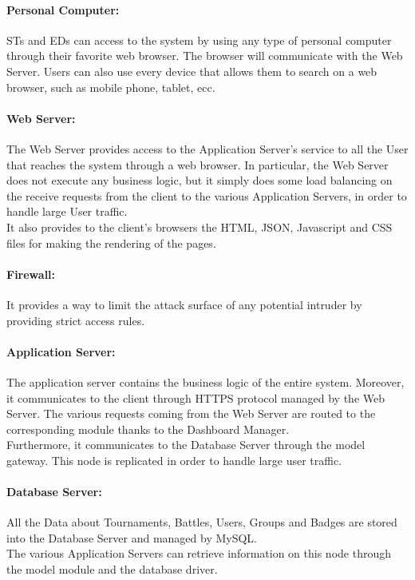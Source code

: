 \paragraph{Personal Computer:}
STs and EDs can access to the system by using any type of personal computer through their favorite web browser. The browser will communicate with the Web Server. Users can also use every device that allows them to search on a web browser, such as mobile phone, tablet, ecc.

\paragraph{Web Server:}
The Web Server provides access to the Application Server’s service to all the User that reaches the system through a web browser. In particular, the Web Server does not execute any business logic, but it simply does some load balancing on the receive requests from the client to the various Application Servers, in order to handle large User traffic.\\
It also provides to the client's browsers the HTML, JSON, Javascript and CSS files for making the rendering of the pages.

\paragraph{Firewall:}
It provides a way to limit the attack surface of any potential intruder by providing strict access rules.

\paragraph{Application Server:}
The application server contains the business logic of the entire system. Moreover, it communicates to the client through HTTPS protocol managed by the Web Server. The various requests coming from the Web Server are routed to the corresponding module thanks to the Dashboard Manager.\\
Furthermore, it communicates to the Database Server through the model gateway. This node is replicated in order to handle large user traffic.

\paragraph{Database Server:}
All the Data about Tournaments, Battles, Users, Groups and Badges are stored into the Database Server and managed by MySQL.\\
The various Application Servers can retrieve information on this node through the model module and the database driver.

